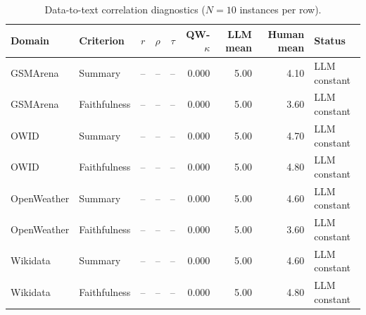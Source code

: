 \begin{table}[!htbp]
\centering
\caption{Data-to-text correlation diagnostics ($N=10$ instances per row).}
\label{tab:judge-human-text-correlation}
\begin{tabular}{llrrrrrrl}
\hline
\textbf{Domain} & \textbf{Criterion} & \textbf{$r$} & \textbf{$\rho$} & \textbf{$\tau$} & \textbf{QW-$\kappa$} & \textbf{LLM mean} & \textbf{Human mean} & \textbf{Status} \\
\hline
GSMArena & Summary & -- & -- & -- & 0.000 & 5.00 & 4.10 & LLM constant \\
GSMArena & Faithfulness & -- & -- & -- & 0.000 & 5.00 & 3.60 & LLM constant \\
OWID & Summary & -- & -- & -- & 0.000 & 5.00 & 4.70 & LLM constant \\
OWID & Faithfulness & -- & -- & -- & 0.000 & 5.00 & 4.80 & LLM constant \\
OpenWeather & Summary & -- & -- & -- & 0.000 & 5.00 & 4.60 & LLM constant \\
OpenWeather & Faithfulness & -- & -- & -- & 0.000 & 5.00 & 3.60 & LLM constant \\
Wikidata & Summary & -- & -- & -- & 0.000 & 5.00 & 4.60 & LLM constant \\
Wikidata & Faithfulness & -- & -- & -- & 0.000 & 5.00 & 4.80 & LLM constant \\
\hline
\end{tabular}
\end{table}

